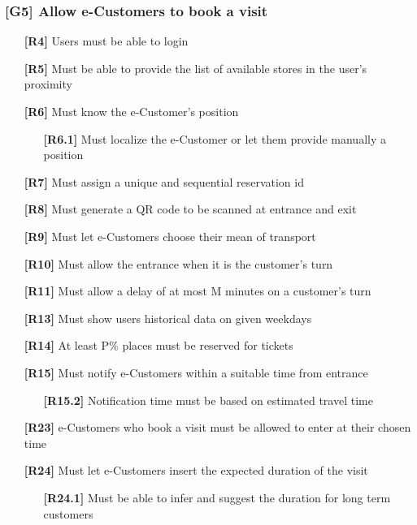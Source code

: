 \subsubsection{[G5] Allow e-Customers to book a visit}
\begin{itemize}
	\setlength\itemsep{-1mm}
	\item [\textbf{[R4]}] Users must be able to login
	\item [\textbf{[R5]}] Must be able to provide the list of available stores in the user’s proximity
	\item [\textbf{[R6]}] Must know the e-Customer’s position
	\begin{itemize}[itemsep=-1mm, topsep=-1mm]
		\item [\textbf{[R6.1]}] Must localize the e-Customer or let them provide manually a position
	\end{itemize}
	\item [\textbf{[R7]}] Must assign a unique and sequential reservation id
	\item [\textbf{[R8]}] Must generate a QR code to be scanned at entrance and exit
	\item [\textbf{[R9]}] Must let e-Customers choose their mean of transport
	\item [\textbf{[R10]}] Must allow the entrance when it is the customer’s turn
	\item [\textbf{[R11]}] Must allow a delay of at most M minutes on a customer’s turn
	\item [\textbf{[R13]}] Must show users historical data on given weekdays
	\item [\textbf{[R14]}] At least P\% places must be reserved for tickets
	\item [\textbf{[R15]}] Must notify e-Customers within a suitable time from entrance
	\begin{itemize}[itemsep=-1mm, topsep=-1mm]
		\item [\textbf{[R15.2]}] Notification time must be based on estimated travel time
	\end{itemize}
	\item [\textbf{[R23]}] e-Customers who book a visit must be allowed to enter at their chosen time
	\item [\textbf{[R24]}] Must let e-Customers insert the expected duration of the visit
	\begin{itemize}[itemsep=-1mm, topsep=-1mm]
		\item [\textbf{[R24.1]}] Must be able to infer and suggest the duration for long term customers
	\end{itemize}

\end{itemize}
